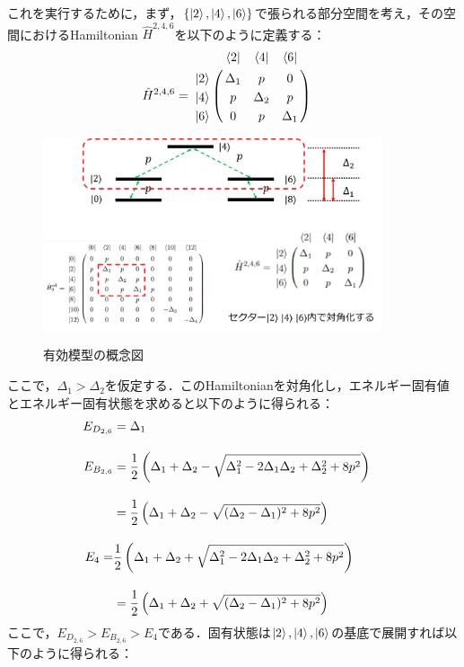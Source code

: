 これを実行するために，まず，$\{\ket{2}, \ket{4}, \ket{6}\}$で張られる部分空間を考え，その空間におけるHamiltonian $\hat{H}^{2,4,6}$を以下のように定義する：
\begin{align}
    \hat{H}^{2,4,6}&=\bordermatrix{
    & \bra{2} &  \bra{4}&  \bra{6}\cr
  \ket{2}&\Delta_1&p&0\cr
  \ket{4}&p&\Delta_2&p\cr
  \ket{6}&0&p&\Delta_1\cr
  }
\end{align}
\begin{figure}[h]
\centering
		\includegraphics[width=10cm]{file/fig/effective_0and8/KPO_effective_0and8_3.png} \\
\caption{有効模型の概念図}
\label{fig:kpo_effective_0and8_3}
\end{figure}
ここで，$\Delta_1>\Delta_2$を仮定する．このHamiltonianを対角化し，エネルギー固有値とエネルギー固有状態を求めると以下のように得られる：
\begin{align}
    E_{D_{2,6}}&=
    {\Delta_{1}}\\[10pt]
    E_{B_{2,6}}&=
    \frac{1}{2}\left(\Delta_1+\Delta_2-\sqrt{\Delta_1^2-2\Delta_1\Delta_2+\Delta_2^2+8p^2}\right)&\nn[10pt]
    &=\frac{1}{2}\left({\Delta_{1}}+{\Delta_{2}}-\sqrt{{
    (\Delta_{2}}-{\Delta_{1}})^2+8{p}^2}\right)\\[10pt]
    E_4=&\frac{1}{2}\left(\Delta_1+\Delta_2+\sqrt{\Delta_1^2-2\Delta_1\Delta_2+\Delta_2^2+8p^2}\right)
    \nn[10pt]
    &=\frac{1}{2}\left({\Delta_{1}}+{\Delta_{2}}
    +\sqrt{{
    (\Delta_{2}}-{\Delta_{1}})^2+8p^2}\right)
\end{align}
ここで，$E_{D_{2,6}} > E_{B_{2,6}} > E_4$である．固有状態は$\ket{2}, \ket{4}, \ket{6}$の基底で展開すれば以下のように得られる：
